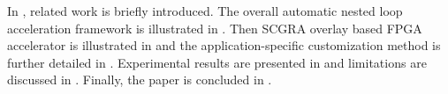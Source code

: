 In , related work is briefly introduced. 
The overall automatic nested loop acceleration framework is illustrated 
in . Then SCGRA overlay based FPGA accelerator 
is illustrated in  and the application-specific customization 
method is further detailed in . 
Experimental results are presented in  and limitations are 
discussed in . Finally, the paper is 
concluded in .


